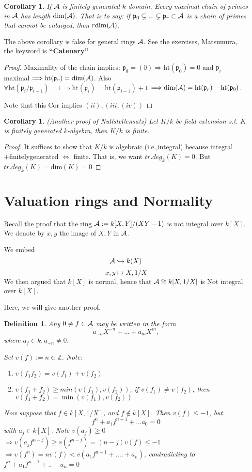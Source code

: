 \documentclass[11pt]{article}
\newtheorem{cor}[thm]{Corollary}
\newtheorem{dfn}[thm]{Definition}
\newcommand{\intg}{\mathbb Z}
\newcommand{\scp}{{\mathfrak p}}
\newcommand{\cala}{{\cal A}}
\newcommand{\Lrta}{\Longrightarrow}
\newcommand{\Llrta}{\Longleftrightarrow}
\newcommand{\inj}{\hookrightarrow}
\begin{document}
\begin{cor}
If $\cala$ is  finitely generated $k$-domain. Every maximal chain of primes in $\cala$ has length $\text{dim}(\cala)$. That is to say: if $\scp_0\subsetneq ...\subsetneq \scp_r\subset \cala$ is a chain of primes that cannot be enlarged, then $r\text{dim}(\cala)$.
\end{cor}
The above corollary is false for general rings $\cala$. See the exercises, Matsumura, the keyword is \textbf{``Catenary''}
\begin{proof}
Maximality of the chain implies: $\scp_0=(0)\Lrta \text{ht}(\scp_0)=0$ and $\scp_r$ maximal $\Lrta \text{ht}(\scp_r)=\text{dim}(\cala)$. Also $\forall \text{ht}(\scp_i/\scp_{i-1})=1\Lrta \text{ht}(\scp_i)=\text{ht}(\scp_{i-1})+1$ $\Lrta \text{dim}(\cala)=\text{ht}(\scp_r)-\text{ht}(\scp_0)$.

Note that this Cor implies $(ii),(iii,(iv))$
\end{proof} 

\begin{cor}
(Another proof of Nullstellensatz) Let $K/k$ be field extension s.t. $K$ is finitely generated $k$-algebra, then $K/k$ is finite.
\end{cor}
\begin{proof}
It suffices to show that $K/k$ is algebraic (i.e.,integral) because integral +finitelygenerated $\Llrta$ finite. That is, we want $tr.deg_k(K)=0$. But $tr.deg_k(K)=\text{dim}(K)=0$
\end{proof}


\section{Valuation rings and Normality}
Recall the proof that the ring $\cala:=k[X,Y]/(XY-1)$ is not integral over $k[X]$. We denote by $x,y$ the image of $X,Y$ in $\cala$.

We embed 
$$\cala\inj k(X)$$
$$
x,y\longmapsto X,1/X
$$
We then argued that $k[X]$ is normal, hence that $\cala \cong k[X,1/X]$ is Not integral over $k[X]$.

Here, we will give another proof.
\begin{dfn}
Any $0\neq f\in\cala$ may be written in the form
$$
a_{-n}X^{-n}+...+a_m X^{m},
$$
where $a_j\in k, a_{-n}\neq 0$.

Set $v(f):=n\in \intg$.
Note:
\begin{enumerate}
\item 
$
v(f_1f_2)=v(f_1)+v(f_2)
$
\item $v(f_1+f_2)\geq min(v(f_1),v(f_2))$, if $v(f_1)\neq v(f_2)$, then $v(f_1+f_2)=\min (v(f_1),v(f_2))$
\end{enumerate}

Now suppose that $f\in k[X,1/X]$, and $f\notin k[X]$. Then $v(f)\leq -1$, but 
$$
f^n+a_1 f^{n-1}+...a_0=0
$$
with $a_{j}\in k[X]$. Note $v(a_j)\geq 0$\\
$\Lrta v(a_j f^{n-j})\geq v(f^{n-j})=(n-j)v(f)\leq -1$\\
$\Lrta v(f^n)=nv(f)< v(a_1 f^{n-1}+....+a_n)$, contradicting to $f^n+a_1 f^{n-1}+..+a_n=0$
\end{dfn}
\end{document}
